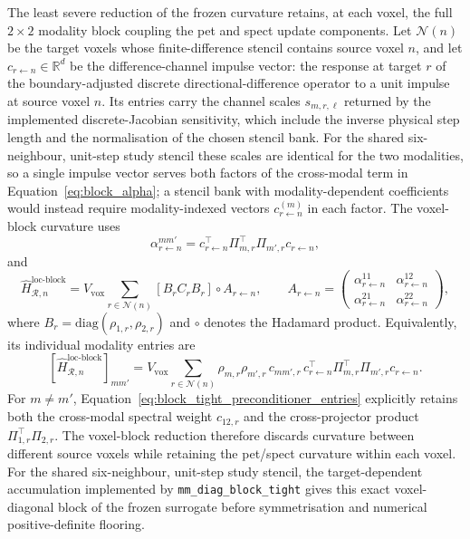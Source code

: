 The least severe reduction of the frozen curvature retains, at each voxel, the full $2\times2$ modality block coupling the \gls{pet} and \gls{spect} update components. Let $\mathcal{N}(n)$ be the target voxels whose finite-difference stencil contains source voxel $n$, and let $c_{r\leftarrow n}\in\mathbb{R}^{d}$ be the difference-channel impulse vector: the response at target $r$ of the boundary-adjusted discrete directional-difference operator to a unit impulse at source voxel $n$. Its entries carry the channel scales $s_{m,r,\ell}$ returned by the implemented discrete-Jacobian sensitivity, which include the inverse physical step length and the normalisation of the chosen stencil bank. For the shared six-neighbour, unit-step study stencil these scales are identical for the two modalities, so a single impulse vector serves both factors of the cross-modal term in Equation~\eqref{eq:block_alpha}; a stencil bank with modality-dependent coefficients would instead require modality-indexed vectors $c^{(m)}_{r\leftarrow n}$ in each factor. The voxel-block curvature uses
\begin{equation}
    \alpha_{r\leftarrow n}^{mm'}
    =
    c_{r\leftarrow n}^\top
    \Pi_{m,r}^\top
    \Pi_{m',r}
    c_{r\leftarrow n},
    \label{eq:block_alpha}
\end{equation}
and
\begin{equation}
    \widehat H_{\mathcal R,n}^{\mathrm{loc\text{-}block}}
    =
    V_{\mathrm{vox}}
    \sum_{r\in\mathcal{N}(n)}
    \left[
        B_r C_r B_r
    \right]
    \circ
    A_{r\leftarrow n},
    \qquad
    A_{r\leftarrow n}
    =
    \begin{pmatrix}
        \alpha_{r\leftarrow n}^{11} & \alpha_{r\leftarrow n}^{12}\\
        \alpha_{r\leftarrow n}^{21} & \alpha_{r\leftarrow n}^{22}
    \end{pmatrix},
    \label{eq:block_tight_preconditioner}
\end{equation}
where $B_r=\mathrm{diag}(\rho_{1,r},\rho_{2,r})$ and $\circ$ denotes the Hadamard product.
Equivalently, its individual modality entries are
\begin{equation}
    \left[\widehat H_{\mathcal R,n}^{\mathrm{loc\text{-}block}}\right]_{mm'}
    =
    V_{\mathrm{vox}}
    \sum_{r\in\mathcal{N}(n)}
    \rho_{m,r}\rho_{m',r}\,
    c_{mm',r}\,
    c_{r\leftarrow n}^{\top}
    \Pi_{m,r}^{\top}\Pi_{m',r}
    c_{r\leftarrow n}.
    \label{eq:block_tight_preconditioner_entries}
\end{equation}
For $m\neq m'$, Equation~\eqref{eq:block_tight_preconditioner_entries} explicitly retains both the cross-modal spectral weight $c_{12,r}$ and the cross-projector product $\Pi_{1,r}^{\top}\Pi_{2,r}$. The voxel-block reduction therefore discards curvature between different source voxels while retaining the \gls{pet}/\gls{spect} curvature within each voxel. For the shared six-neighbour, unit-step study stencil, the target-dependent accumulation implemented by \texttt{mm\_diag\_block\_tight} gives this exact voxel-diagonal block of the frozen surrogate before symmetrisation and numerical positive-definite flooring.


